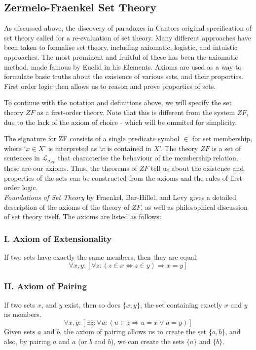 \documentclass[11pt]{article}
\theoremstyle{definition}
\theoremstyle{theorem}
\theoremstyle{lemma}
\begin{document}
\subsection{Zermelo-Fraenkel Set Theory}
As discussed above, the discovery of paradoxes in Cantors original specification of set theory called for a re-evaluation of set theory.
Many different approaches have been taken to formalise set theory, including axiomatic, logistic, and intuistic approaches.
The most prominent and fruitful of these has been the axiomatic method, made famous by Euclid in his Elements.
Axioms are used as a way to formulate basic truths about the existence of various sets, and their properties.
First order logic then allows us to reason and prove properties of sets.

To continue with the notation and definitions above, we will specify the set theory $\mathit{ZF}$ as a first-order theory.
Note that this is different from the system $\mathit{ZF}$, due to the lack of the axiom of choice - which will be ommited for simplicity.

The signature for ZF consists of a single predicate symbol $\in$ for set membership, where `$x \in X$' is interpreted as `$x$ is contained in $X$'.
The theory $\mathit{ZF}$ is a set of sentences in $\mathcal{L}_{\sigma_{\mathit{ZF}}}$ that characterise the behaviour of the membership relation, these are our axioms.
Thus, the theorems of $\mathit{ZF}$ tell us about the existence and properties of the sets can be constructed from the axioms and the rules of first-order logic.\\

\noindent
\textit{Foundations of Set Theory} by Fraenkel, Bar-Hillel, and Levy \cite{foundations} gives a detailed description of the axioms of the theory of $\mathit{ZF}$, as well as philosophical discussion of set theory itself.
The axioms are listed as follows:

\subsubsection*{I. Axiom of Extensionality}
If two sets have exactly the same members, then they are equal:
$$\forall x,y: [\forall z: (z\in x \Leftrightarrow z\in y) \Rightarrow x=y]$$

\subsubsection*{II. Axiom of Pairing}
If two sets $x$, and $y$ exist, then so does $\{x,y\}$, the set containing exactly $x$ and $y$ as members.
$$\forall x,y: [\exists z: \forall u: (u\in z \Rightarrow u=x \vee u=y)]$$
Given sets $a$ and $b$, the axiom of pairing allows us to create the set $\{a,b\}$, and also, by pairing $a$ and $a$ (or $b$ and $b$), we can create the sets $\{a\}$ and $\{b\}$.
\end{document}
